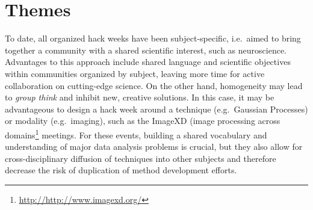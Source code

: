 \section*{Themes}

To date, all organized hack weeks have been subject-specific, i.e.\ aimed to bring together a community with a shared scientific interest, such as neuroscience.
Advantages to this approach include shared language and scientific objectives within communities organized by subject, leaving more time for active collaboration on cutting-edge science.
On the other hand, homogeneity may lead to \textit{group think} and inhibit new, creative solutions. 
In this case, it may be advantageous to design a hack week around a technique (e.g.\ Gaussian Processes) or modality (e.g.\ imaging), such as the ImageXD (image processing across domains\footnote{\url{http://http://www.imagexd.org/}} meetings. 
For these events, building a shared vocabulary and understanding of major data analysis problems is crucial, but they also allow for cross-disciplinary diffusion of techniques into other subjects and therefore decrease the risk of duplication of method development efforts.



